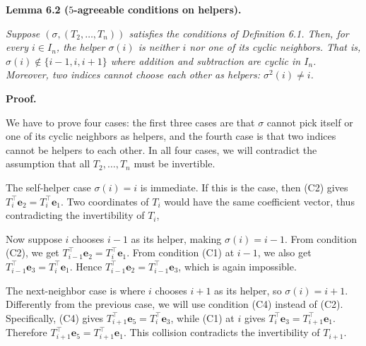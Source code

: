 

\par\medskip\noindent\textbf{
\textbf{Lemma 6.2}\textbf{ }($5$-agreeable conditions on helpers)\textbf{.}
}\par



\emph{Suppose $(\sigma,(T_{2},\ldots,T_{n}))$ satisfies the conditions of Definition 6.1. Then, for every $i\in I_{n}$, the helper $\sigma(i)$ is neither $i$ nor one of its cyclic neighbors. That is,
$\sigma(i)\notin\{i-1,i,i+1\}$
where addition and subtraction are cyclic in $I_{n}$. Moreover, two indices cannot choose each other as helpers:
$\sigma^{2}(i)\neq i$.}\par






\par\medskip\noindent\textbf{Proof.}\par




We have to prove four cases: the first three cases are that $\sigma$ cannot pick itself or one of its cyclic neighbors as helpers, and the fourth case is that two indices cannot be helpers to each other. In all four cases, we will contradict the assumption that all $T_{2},\ldots,T_{n}$ must be invertible.\par




The self-helper case $\sigma(i)=i$ is immediate. If this is the case, then (C2) gives $T_{i}^{\top}\mathbf{e}_{2}=T_{i}^{\top}\mathbf{e}_{1}$. Two coordinates of $T_{i}$ would have the same coefficient vector, thus contradicting the invertibility of $T_{i}$,\par




Now suppose $i$ chooses $i-1$ as its helper, making $\sigma(i)=i-1$. From condition (C2), we get $T_{i-1}^{\top}\mathbf{e}_{2}=T_{i}^{\top}\mathbf{e}_{1}$. From condition (C1) at $i-1$, we also get $T_{i-1}^{\top}\mathbf{e}_{3}=T_{i}^{\top}\mathbf{e}_{1}$. Hence $T_{i-1}^{\top}\mathbf{e}_{2}=T_{i-1}^{\top}\mathbf{e}_{3}$, which is again impossible.\par




The next-neighbor case is where $i$ chooses $i+1$ as its helper, so $\sigma(i)=i+1$.
Differently from the previous case, we will use condition (C4) instead of (C2). Specifically, (C4) gives $T_{i+1}^{\top}\mathbf{e}_{5}=T_{i}^{\top}\mathbf{e}_{3}$, while (C1) at $i$ gives $T_{i}^{\top}\mathbf{e}_{3}=T_{i+1}^{\top}\mathbf{e}_{1}$. Therefore $T_{i+1}^{\top}\mathbf{e}_{5}=T_{i+1}^{\top}\mathbf{e}_{1}$. This collision contradicts the invertibility of $T_{i+1}$.\par




